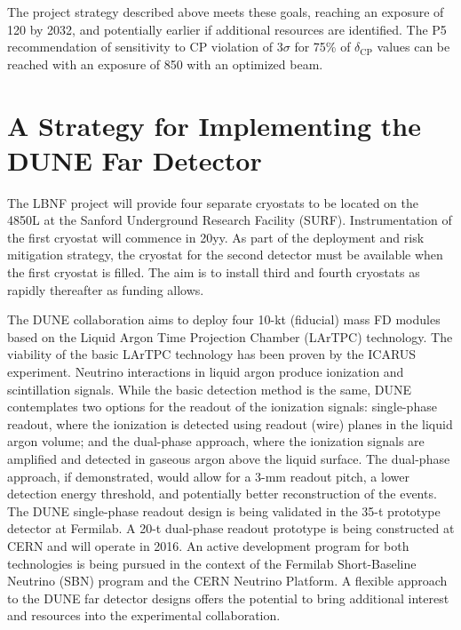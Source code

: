 \vspace{6pt}
The project strategy described above meets these goals, reaching an exposure of 
\num{120}\ktMWyr{} by 2032, and potentially earlier if additional resources are identified. 
The P5 recommendation of sensitivity to CP violation of 3$\sigma$ for 75\% of $\delta_\text{CP}$
values can be reached with an exposure of \num{850}\ktMWyr{} with an optimized beam.

\section{A Strategy for Implementing the DUNE Far Detector}

The LBNF project will provide four separate cryostats to be located on the 4850L at the 
Sanford Underground Research Facility (SURF).  Instrumentation of the first cryostat 
will commence in 20yy. %
As part of the deployment and risk mitigation strategy, 
the cryostat for the second detector must be available when the first cryostat 
is filled. The aim is to install third and fourth cryostats as rapidly thereafter as funding 
allows.

The DUNE collaboration aims to deploy four 10-kt (fiducial) mass FD modules based 
on the Liquid Argon Time Projection Chamber (LArTPC) technology. The viability 
of the basic LArTPC technology has been proven by the ICARUS experiment. Neutrino 
interactions in liquid argon produce ionization and scintillation signals. While 
the basic detection method is the same, DUNE contemplates two options for the readout 
of the ionization signals: single-phase readout, where the ionization is detected 
using readout (wire) planes in the liquid argon volume; and the dual-phase approach, where 
the ionization signals are amplified and detected in gaseous argon above the liquid 
surface. The dual-phase approach, if demonstrated, would allow for a 3-mm readout 
pitch, a lower detection energy threshold, and potentially better reconstruction of 
the events. The DUNE single-phase readout design is being validated 
in the 35-t prototype detector at Fermilab. A 20-t dual-phase readout prototype is being 
constructed at CERN and will operate in 2016. An active development program for 
both technologies is being pursued in the context of the Fermilab Short-Baseline Neutrino (SBN)
program and 
the CERN Neutrino Platform. 
A flexible 
approach to the DUNE far detector designs offers the potential to bring additional 
interest and resources into the experimental collaboration. 

